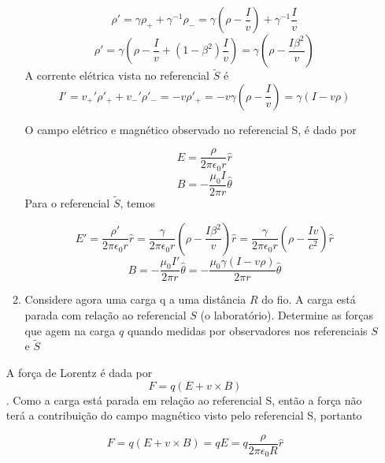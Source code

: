 \documentclass[10pt,a4paper]{article}
\begin{document}
\begin{enumerate}
\begin{enumerate}
		\begin{equation*}
			\rho\prime = \gamma\rho_+ + \gamma^{-1}\rho_- = \gamma (\rho -\dfrac{I}{v} ) + \gamma^{-1}\dfrac{I}{v}
		\end{equation*}
		$$ \rho\prime = \gamma \left(\rho - \dfrac{I}{v} + (1 - \beta^2)\dfrac{I}{v}\right) = \gamma \left(\rho 
		-\dfrac{I\beta^2}{v}\right)$$
		A corrente elétrica vista no referencial $\tilde{S}$ é
		\begin{equation*}
			I\prime = v_+\prime \rho\prime_+ + v_- \prime \rho\prime_- = - v \rho\prime_+ = - v \gamma (\rho - \dfrac{I}{v}) = \gamma (I - v\rho)
		\end{equation*}
		
		O campo elétrico e magnético observado no referencial S, é dado por
		
		\begin{equation*}
			E = \dfrac{\rho}{2\pi\epsilon_0 r} \hat{r}
		\end{equation*}
		\begin{equation*}
			B = - \dfrac{\mu_0 I}{2\pi r} \hat{\theta}
		\end{equation*}
		Para o referencial $\tilde{S}$, temos
		
		\begin{equation*}
			E\prime = \dfrac{\rho\prime}{2\pi\epsilon_0 r} \hat{r} = \dfrac{\gamma}{2\pi\epsilon_0 r} \left(\rho 
			-\dfrac{I\beta^2}{v}\right) \hat{r} = \dfrac{\gamma}{2\pi\epsilon_0 r} \left(\rho 
			-\dfrac{Iv}{c^2}\right) \hat{r}
		\end{equation*}
		\begin{equation*}
			B = - \dfrac{\mu_0 I\prime}{2\pi r} \hat{\theta} = - \dfrac{\mu_0 \gamma (I - v\rho)}{2\pi r} \hat{\theta}
		\end{equation*}
		
		\item Considere agora uma carga q a uma distância $R$ do fio. A carga está parada com relação ao referencial $S$ (o laboratório). Determine as forças que agem na carga $q$ quando medidas por observadores nos referenciais $S$ e $\tilde{S}$
	\end{enumerate}
	
	A força de Lorentz é dada por
	$$F = q (E + v\times B)$$. Como a carga está parada em relação ao referencial S, então a força não terá a contribuição do campo magnético visto pelo referencial S, portanto
	
	\begin{equation*}
		F = q (E + v\times B) = q E = q  \dfrac{\rho}{2\pi\epsilon_0 R} \hat{r}
	\end{equation*}
	

\end{enumerate}
\end{document}
